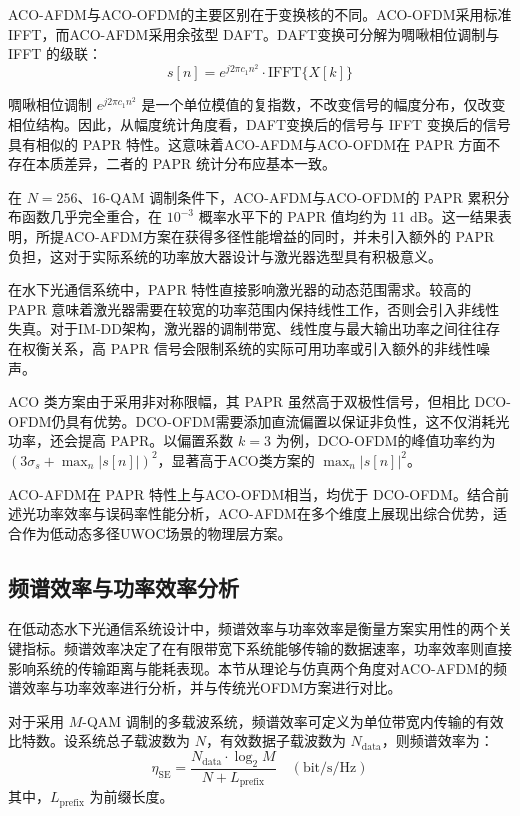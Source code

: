 ACO-AFDM与ACO-OFDM的主要区别在于变换核的不同。ACO-OFDM采用标准 IFFT，而ACO-AFDM采用余弦型 DAFT。DAFT变换可分解为啁啾相位调制与 IFFT 的级联：
\begin{equation}
s[n] = e^{j2\pi c_1 n^2} \cdot \mathrm{IFFT}\{X[k]\}
\end{equation}

啁啾相位调制 $e^{j2\pi c_1 n^2}$ 是一个单位模值的复指数，不改变信号的幅度分布，仅改变相位结构。因此，从幅度统计角度看，DAFT变换后的信号与 IFFT 变换后的信号具有相似的 PAPR 特性。这意味着ACO-AFDM与ACO-OFDM在 PAPR 方面不存在本质差异，二者的 PAPR 统计分布应基本一致。

在 $N=256$、16-QAM 调制条件下，ACO-AFDM与ACO-OFDM的 PAPR 累积分布函数几乎完全重合，在 $10^{-3}$ 概率水平下的 PAPR 值均约为 11 dB。这一结果表明，所提ACO-AFDM方案在获得多径性能增益的同时，并未引入额外的 PAPR 负担，这对于实际系统的功率放大器设计与激光器选型具有积极意义。


在水下光通信系统中，PAPR 特性直接影响激光器的动态范围需求。较高的 PAPR 意味着激光器需要在较宽的功率范围内保持线性工作，否则会引入非线性失真。对于IM-DD架构，激光器的调制带宽、线性度与最大输出功率之间往往存在权衡关系，高 PAPR 信号会限制系统的实际可用功率或引入额外的非线性噪声。

ACO 类方案由于采用非对称限幅，其 PAPR 虽然高于双极性信号，但相比 DCO-OFDM仍具有优势。DCO-OFDM需要添加直流偏置以保证非负性，这不仅消耗光功率，还会提高 PAPR。以偏置系数 $k=3$ 为例，DCO-OFDM的峰值功率约为 $(3\sigma_s + \max_n |s[n]|)^2$，显著高于ACO类方案的 $\max_n |s[n]|^2$。

ACO-AFDM在 PAPR 特性上与ACO-OFDM相当，均优于 DCO-OFDM。结合前述光功率效率与误码率性能分析，ACO-AFDM在多个维度上展现出综合优势，适合作为低动态多径UWOC场景的物理层方案。

\subsection{频谱效率与功率效率分析}
\label{subsec:spectral_power_efficiency}

在低动态水下光通信系统设计中，频谱效率与功率效率是衡量方案实用性的两个关键指标。频谱效率决定了在有限带宽下系统能够传输的数据速率，功率效率则直接影响系统的传输距离与能耗表现。本节从理论与仿真两个角度对ACO-AFDM的频谱效率与功率效率进行分析，并与传统光OFDM方案进行对比。


对于采用 $M$-QAM 调制的多载波系统，频谱效率可定义为单位带宽内传输的有效比特数。设系统总子载波数为 $N$，有效数据子载波数为 $N_{\mathrm{data}}$，则频谱效率为：
\begin{equation}
\eta_{\mathrm{SE}} = \frac{N_{\mathrm{data}} \cdot \log_2 M}{N + L_{\mathrm{prefix}}} \quad (\text{bit/s/Hz})
\end{equation}
其中，$L_{\mathrm{prefix}}$ 为前缀长度。

